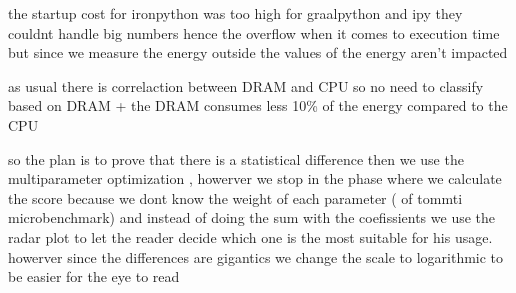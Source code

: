 the startup cost for ironpython was too high
for graalpython and ipy they couldnt handle big numbers hence the overflow  when it comes to execution time
but since we measure the energy outside the values of the energy aren't impacted

as usual there is  correlaction between DRAM and CPU so no need to classify based on DRAM + the DRAM consumes less 10\% of the  energy compared to the CPU

so the plan is to prove that there is a statistical difference
then we use the multiparameter optimization , howerver we stop in the phase where we calculate the score
because we dont know the weight of each parameter ( of tommti microbenchmark) and instead of doing the sum with the coefissients we use the radar plot to let the reader decide which one is the most suitable for his usage. howerver since the differences are gigantics we change the scale to logarithmic to be easier for the eye to read



